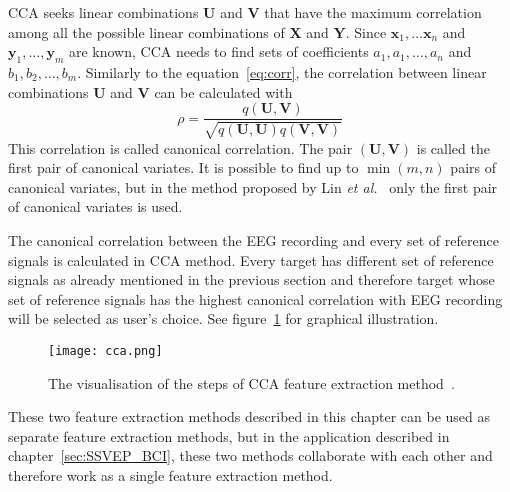 \gls{CCA} seeks \glspl{linear combination} $\mathbf{U}$ and $\mathbf{V}$ that have the maximum \gls{correlation} among all the possible \glspl{linear combination} of $\mathbf{X}$ and $\mathbf{Y}$. Since $\mathbf{x}_1,\dots\mathbf{x}_n$ and $\mathbf{y}_1,\dots,\mathbf{y}_m$ are known, \gls{CCA}  needs to find sets of coefficients $a_1, a_1, \dots, a_n$ and $b_1, b_2, \dots, b_m$. Similarly to the equation~\ref{eq:corr}, the \gls{correlation} between \glspl{linear combination} $\mathbf{U}$ and $\mathbf{V}$ can be calculated with
\begin{equation}
	\rho = \frac{q(\mathbf{U}, \mathbf{V})}{\sqrt{q(\mathbf{U},\mathbf{U})q(\mathbf{V},\mathbf{V})}}
\end{equation}
This \gls{correlation} is called \gls{canonical correlation}. The pair $(\mathbf{U}, \mathbf{V})$ is called the first pair of canonical variates. It is possible to find up to $\min(m, n)$ pairs of canonical variates, but in the method proposed by Lin \textit{et al.}~\cite{cca_lin} only the first pair of canonical variates is used.

The \gls{canonical correlation} between the \gls{EEG} recording and every set of \glspl{reference signal} is calculated in \gls{CCA} method. Every \gls{target} has different set of \glspl{reference signal} as already mentioned in the previous section and therefore \gls{target} whose set of \glspl{reference signal} has the highest \gls{canonical correlation} with \gls{EEG} recording will be selected as user's choice. See figure~\ref{fig:cca} for graphical illustration.

\begin{figure}[h]
	\centering
	\texttt{[image: cca.png]}
	\caption{The visualisation of the steps of CCA feature extraction method~\cite{bin2009cca}.}
	\label{fig:cca}
\end{figure}

These two \gls{feature extraction} methods described in this chapter can be used as separate \gls{feature extraction} methods, but in the application described in chapter~\ref{sec:SSVEP_BCI}, these two methods collaborate with each other and therefore work as a single \gls{feature extraction} method.
